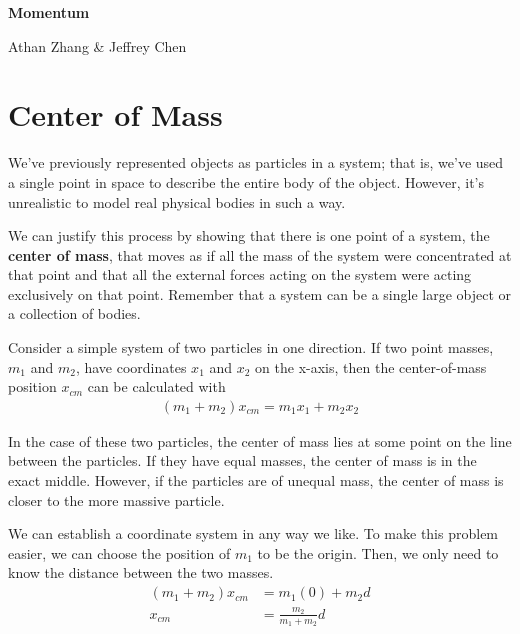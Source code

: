 \documentclass[11pt]{article}
\begin{document}
\textbf{\Huge Momentum}

Athan Zhang \& Jeffrey Chen

\section{Center of Mass}

We've previously represented objects as particles in a system; that is, we've used a single point in space to describe the entire body of the object. However, it's unrealistic to model real physical bodies in such a way. 

We can justify this process by showing that there is one point of a system, the \textbf{center of mass}, that moves as if all the mass of the system were concentrated at that point and that all the external forces acting on the system were acting exclusively on that point. Remember that a system can be a single large object or a collection of bodies.

Consider a simple system of two particles in one direction. If two point masses, $m_1$ and $m_2$, have coordinates $x_1$ and $x_2$ on the x-axis, then the center-of-mass position $x_{cm}$ can be calculated with
\begin{align*}
    (m_1 + m_2)x_{cm} = m_1 x_1 + m_2 x_2
\end{align*}


In the case of these two particles, the center of mass lies at some point on the line between the particles. If they have equal masses, the center of mass is in the exact middle. However, if the particles are of unequal mass, the center of mass is closer to the more massive particle.


We can establish a coordinate system in any way we like. To make this problem easier, we can choose the position of $m_1$ to be the origin. Then, we only need to know the distance between the two masses.
\begin{align*}
    (m_1 + m_2)x_{cm} &= m_1 (0) + m_2 d \\
    x_{cm} &= \frac{m_2}{m_1 + m_2}d
\end{align*}
\end{document}
